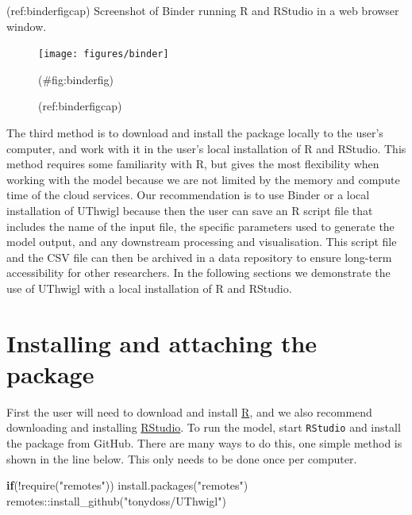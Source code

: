 \documentclass[]{elsarticle} %
\newenvironment{Shaded}{\begin{snugshade}}{\end{snugshade}}
\newcommand{\ControlFlowTok}[1]{\textcolor[rgb]{0.13,0.29,0.53}{\textbf{#1}}}
\newcommand{\FunctionTok}[1]{\textcolor[rgb]{0.00,0.00,0.00}{#1}}
\newcommand{\NormalTok}[1]{#1}
\newcommand{\SpecialCharTok}[1]{\textcolor[rgb]{0.00,0.00,0.00}{#1}}
\newcommand{\StringTok}[1]{\textcolor[rgb]{0.31,0.60,0.02}{#1}}
\begin{document}
(ref:binderfigcap) Screenshot of Binder running R and RStudio in a web browser window.

\begin{figure}
\texttt{[image: figures/binder]} \caption{(ref:binderfigcap)}(\#fig:binderfig)
\end{figure}

The third method is to download and install the package locally to the user's computer, and work with it in the user's local installation of R and RStudio. This method requires some familiarity with R, but gives the most flexibility when working with the model because we are not limited by the memory and compute time of the cloud services. Our recommendation is to use Binder or a local installation of UThwigl because then the user can save an R script file that includes the name of the input file, the specific parameters used to generate the model output, and any downstream processing and visualisation. This script file and the CSV file can then be archived in a data repository to ensure long-term accessibility for other researchers. In the following sections we demonstrate the use of UThwigl with a local installation of R and RStudio.

\hypertarget{installing-and-attaching-the-package}{%
\section{Installing and attaching the package}\label{installing-and-attaching-the-package}}

First the user will need to download and install \href{https://www.r-project.org/}{R}, and we also recommend downloading and installing \href{https://www.rstudio.com/}{RStudio}. To run the model, start \texttt{RStudio} and install the package from GitHub. There are many ways to do this, one simple method is shown in the line below. This only needs to be done once per computer.

\begin{Shaded}
\begin{Highlighting}[]
\ControlFlowTok{if}\NormalTok{(}\SpecialCharTok{!}\FunctionTok{require}\NormalTok{(}\StringTok{"remotes"}\NormalTok{)) }\FunctionTok{install.packages}\NormalTok{(}\StringTok{"remotes"}\NormalTok{)}
\NormalTok{remotes}\SpecialCharTok{::}\FunctionTok{install\_github}\NormalTok{(}\StringTok{"tonydoss/UThwigl"}\NormalTok{)}
\end{Highlighting}
\end{Shaded}
\end{document}
